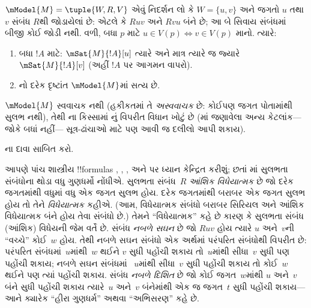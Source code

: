 \documentclass[../../../include/open-logic-section]{subfiles}
\begin{document}
\begin{prop}
  $\mModel{M} = \tuple{W, R, V}$ એવું નિદર્શન
  લો કે $W = \{u, v
  \}$ અને જગતો $u$ તથા $v$ સંબંધ $R$થી
  જોડાયેલાં છે: એટલે કે $Ruv$ અને $Rvu$ બંને છે;
  આ બે સિવાય સંબંધમાં બીજી કોઈ જોડી નથી.
  વળી, બધા $p$ માટે $u \in V(p) \Leftrightarrow v
  \in V(p)$ માનો. ત્યારે:
  \begin{enumerate}
  \item બધા $!A$ માટે: $\mSat{M}{!A}[u]$ ત્યારે અને માત્ર ત્યારે
    જ જ્યારે $\mSat{M}{!A}[v]$ (અહીં $!A$ પર આગમન વાપરો).
  \item {}નો દરેક દૃષ્ટાંત $\mModel{M}$માં સત્ય છે.
  \end{enumerate}
  $\mModel{M}$ સ્વવાચક નથી (હકીકતમાં તે
  \emph{અસ્વવાચક} છે: કોઈપણ જગત પોતામાંથી સુલભ નથી),
  તેથી ના કિસ્સામાં
  નું વિપરીત વિધાન ખોટું છે
  (માં જણાવેલા અન્ય કેટલાંક---જોકે બધાં નહીં---
  સૂત્ર-ઢાંચાઓ માટે પણ આવી જ દલીલો આપી શકાય).
\end{prop}

\begin{prob}
  ના દાવા સાબિત કરો.
\end{prob}

આપણે પાંચ શાસ્ત્રીય !!{formula}s ,
, ,  અને  પર ધ્યાન કેન્દ્રિત
કરીશું; છતાં માં સુલભતા
સંબંધોના થોડા વધુ ગુણધર્મો નોંધીએ. સુલભતા
સંબંધ~$R$ \emph{આંશિક વિધેયાત્મક} છે જો દરેક
જગતમાંથી વધુમાં વધુ એક જગત સુલભ હોય. દરેક
જગતમાંથી બરાબર એક જગત સુલભ હોય તો તેને
\emph{વિધેયાત્મક} કહીએ. (આમ, વિધેયાત્મક સંબંધો
બરાબર સિરિયલ અને આંશિક વિધેયાત્મક બંને હોય
તેવા સંબંધો છે.) તેમને ``વિધેયાત્મક'' કહે છે કારણ કે
સુલભતા સંબંધ (આંશિક) વિધેયની જેમ વર્તે છે.
સંબંધ \emph{નબળે સઘન} છે જો $Ruv$ હોય ત્યારે
$u$ અને~$v$ની ``વચ્ચે'' કોઈ~$w$ હોય. તેથી
નબળે સઘન સંબંધો એક અર્થમાં પરંપરિત સંબંધોથી
વિપરીત છે: પરંપરિત સંબંધમાં~$u$માંથી~$w$ થઈને
$v$ સુધી પહોંચી શકાય તો~$u$માંથી સીધા~$v$
સુધી પણ પહોંચી શકાય; નબળે સઘન સંબંધમાં
~$u$માંથી સીધા~$v$ સુધી પહોંચી શકાય તો
કોઈ~$w$ થઈને પણ ત્યાં પહોંચી શકાય.
સંબંધ \emph{નબળે દિશિત} છે જો કોઈ જગત~$w$માંથી
$u$ અને~$v$ બંને સુધી પહોંચી શકાય ત્યારે~$u$
અને~$v$ બંનેમાંથી એક જ જગત~$t$ સુધી પહોંચી
શકાય---આને ક્યારેક ``હીરા ગુણધર્મ'' અથવા
``અભિસરણ'' કહે છે.
\end{document}
